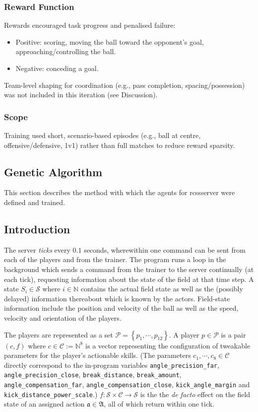 \subsubsection{Reward Function}
Rewards encouraged task progress and penalised failure:
\begin{itemize}
  \item Positive: scoring, moving the ball toward the opponent's goal, approaching/controlling the ball.
  \item Negative: conceding a goal.
\end{itemize}
Team-level shaping for coordination (e.g., pass completion, spacing/possession) was not included in this iteration (see Discussion).

\subsubsection{Scope}
Training used short, scenario-based episodes (e.g., ball at centre, offensive/defensive, 1v1) rather than full matches to reduce reward sparsity.

\subsection{Genetic Algorithm}

This section describes the method with which the agents for rcssserver were defined and trained.

\subsection{Introduction}
The server \textit{ticks} every \(0.1\) seconds, wherewithin one command can be sent from each of the players and from the trainer. The program runs a loop in the background which sends a command from the trainer to the server continually (at each tick), requesting information about the state of the field at that time step. A state \(S_i \in \mathcal{S}\) where \(i \in \mathbb{N}\) contains the actual field state as well as the (possibly delayed) information thereabout which is known by the actors. Field-state information include the position and velocity of the ball as well as the speed, velocity and orientation of the players.

The players are represented as a set \(\mathcal{P}=\left\{p_1,\cdots,p_{12}\right\}\). A player \(p \in \mathcal{P}\) is a pair \((c, f)\) where \(c \in \mathcal{C} := \mathbb{N}^8\) is a vector representing the configuration of tweakable parameters for the player's actionable skills. (The parameters \(c_1,\cdots,c_8\in \mathcal{C}\) directly correspond to the in-program variables
\texttt{angle\_precision\_far}, \texttt{angle\_precision\_close}, \texttt{break\_distance}, \texttt{break\_amount}, \texttt{angle\_compensation\_far}, \texttt{angle\_compensation\_close}, \texttt{kick\_angle\_margin} and \texttt{kick\_distance\_power\_scale}.) \(f : \mathcal{S}\times \mathcal{C} \to \mathcal{S}\) is the the \textit{de facto} effect on the field state of an assigned action \(\mathfrak{a}\in\mathfrak{A}\), all of which return within one tick.

